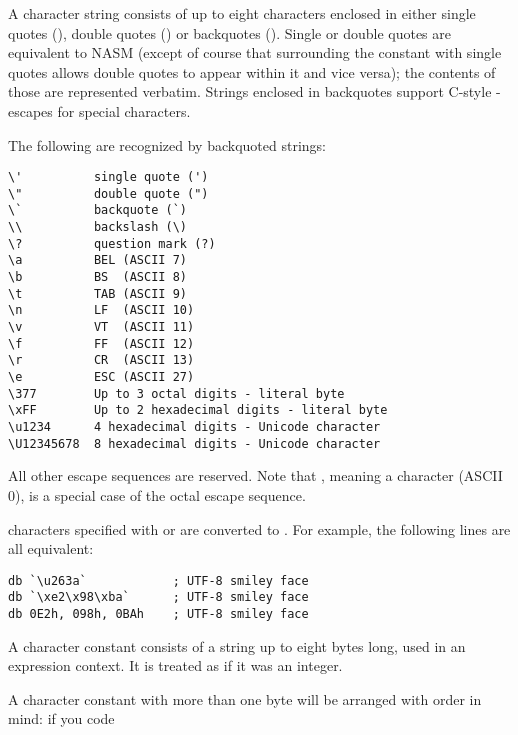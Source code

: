 
A character string consists of up to eight characters enclosed in
either single quotes (), double quotes () or
backquotes (). Single or double quotes are equivalent to
NASM (except of course that surrounding the constant with single
quotes allows double quotes to appear within it and vice versa); the
contents of those are represented verbatim. Strings enclosed in
backquotes support C-style \code{\textbackslash}-escapes for
special characters.

The following  are recognized by
backquoted strings:

\begin{lstlisting}
\'          single quote (')
\"          double quote (")
\`          backquote (`)
\\          backslash (\)
\?          question mark (?)
\a          BEL (ASCII 7)
\b          BS  (ASCII 8)
\t          TAB (ASCII 9)
\n          LF  (ASCII 10)
\v          VT  (ASCII 11)
\f          FF  (ASCII 12)
\r          CR  (ASCII 13)
\e          ESC (ASCII 27)
\377        Up to 3 octal digits - literal byte
\xFF        Up to 2 hexadecimal digits - literal byte
\u1234      4 hexadecimal digits - Unicode character
\U12345678  8 hexadecimal digits - Unicode character
\end{lstlisting}

All other escape sequences are reserved. Note that ,
meaning a  character (ASCII 0), is a special case of
the octal escape sequence.

 characters specified with 
or  are converted to .
For example, the following lines are all equivalent:

\begin{lstlisting}
db `\u263a`            ; UTF-8 smiley face
db `\xe2\x98\xba`      ; UTF-8 smiley face
db 0E2h, 098h, 0BAh    ; UTF-8 smiley face
\end{lstlisting}


A character constant consists of a string up to eight bytes long, used
in an expression context. It is treated as if it was an integer.

A character constant with more than one byte will be arranged
with  order in mind: if you code

